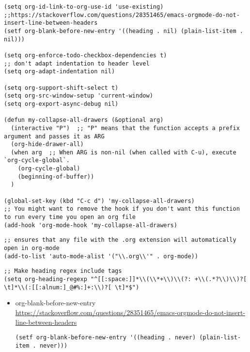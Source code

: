 \documentclass{article}
\begin{document}
\begin{itemize}
\begin{itemize}
\begin{itemize}
\begin{verbatim}
(setq org-id-link-to-org-use-id 'use-existing)
;;https://stackoverflow.com/questions/28351465/emacs-orgmode-do-not-insert-line-between-headers
(setf org-blank-before-new-entry '((heading . nil) (plain-list-item . nil)))

(setq org-enforce-todo-checkbox-dependencies t)
;; don't adapt indentation to header level
(setq org-adapt-indentation nil)

(setq org-support-shift-select t)
(setq org-src-window-setup 'current-window)
(setq org-export-async-debug nil)

(defun my-collapse-all-drawers (&optional arg)
  (interactive "P")  ;; "P" means that the function accepts a prefix argument and passes it as ARG
  (org-hide-drawer-all)
  (when arg  ;; When ARG is non-nil (when called with C-u), execute `org-cycle-global`.
    (org-cycle-global)
    (beginning-of-buffer))
  )

(global-set-key (kbd "C-c d") 'my-collapse-all-drawers)
;; You might want to remove the hook if you don't want this function to run every time you open an org file
(add-hook 'org-mode-hook 'my-collapse-all-drawers)
\end{verbatim}

\begin{verbatim}
;; ensures that any file with the .org extension will automatically open in org-mode
(add-to-list 'auto-mode-alist '("\\.org\\'" . org-mode))

\end{verbatim}
\begin{verbatim}
;; Make heading regex include tags
(setq org-heading-regexp "^[[:space:]]*\\(\\*+\\)\\(?: +\\(.*?\\)\\)?[ \t]*\\(:[[:alnum:]_@#%:]+:\\)?[ \t]*$")

\end{verbatim}



\begin{itemize}
\item org-blank-before-new-entry
\label{sec:org65323e7}
\url{https://stackoverflow.com/questions/28351465/emacs-orgmode-do-not-insert-line-between-headers}
\begin{verbatim}
(setf org-blank-before-new-entry '((heading . never) (plain-list-item . never)))
\end{verbatim}


\end{itemize}
\end{itemize}
\end{itemize}
\end{itemize}
\end{document}
